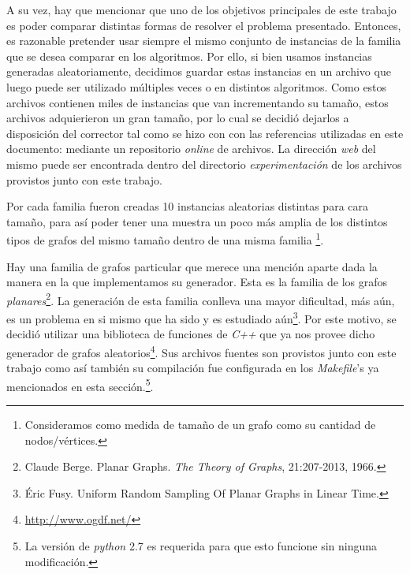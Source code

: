 \par A su vez, hay que mencionar que uno de los objetivos principales de este
    trabajo es poder comparar distintas formas de resolver el problema
    presentado. Entonces, es razonable pretender usar siempre el mismo conjunto
    de instancias de la familia que se desea comparar en los algoritmos. Por
    ello, si bien usamos instancias generadas aleatoriamente, decidimos guardar
    estas instancias en un archivo que luego puede ser utilizado m\'ultiples
    veces o en distintos algoritmos. Como estos archivos contienen miles de
    instancias que van incrementando su tama\~no, estos archivos adquierieron
    un gran tama\~no, por lo cual se decidi\'o dejarlos a disposici\'on del
    corrector tal como se hizo con con las referencias utilizadas en este
    documento: mediante un repositorio \emph{online} de archivos. La direcci\'on
    \emph{web} del mismo puede ser encontrada dentro del directorio \emph{%
    experimentaci\'on} de los archivos provistos junto con este trabajo.

\par Por cada familia fueron creadas 10 instancias aleatorias distintas para
    cara tama\~no, para as\'i poder tener una muestra un poco m\'as amplia 
    de los distintos tipos de grafos del mismo tama\~no dentro de una misma familia
    \footnote{Consideramos como medida de tama\~no de un grafo como su cantidad
    de nodos/v\'ertices.}.

\par Hay una familia de grafos particular que merece una menci\'on aparte dada
    la manera en la que implementamos su generador. Esta es la familia de los
    grafos \emph{planares}\footnote{Claude Berge. Planar Graphs. \emph{The Theory
    of Graphs}, 21:207-2013, 1966.}. La generaci\'on de esta familia conlleva
    una mayor dificultad, m\'as a\'un, es un problema en si mismo que ha sido
    y es estudiado a\'un\footnote{\'Eric Fusy. Uniform Random Sampling Of Planar
    Graphs in Linear Time.}. Por este motivo, se decidi\'o utilizar una
    biblioteca de funciones de \emph{C++} que ya nos provee dicho generador
    de grafos aleatorios\footnote{\url{http://www.ogdf.net/}}. Sus archivos
    fuentes son provistos junto con este trabajo como as\'i tambi\'en su
    compilaci\'on fue configurada en los \emph{Makefile}'s ya mencionados en
    esta secci\'on.\footnote{La versi\'on de \emph{python} 2.7 es requerida para
    que esto funcione sin ninguna modificaci\'on.}.

{}
